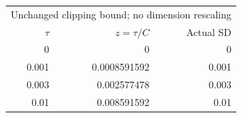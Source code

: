 \begin{tabular}{rrr}
\toprule
\multicolumn{3}{l}{Unchanged clipping bound; no dimension rescaling} \\
$\tau$ & $z=\tau/C$ & Actual SD \\
\midrule
0 & 0 & 0 \\
0.001 & 0.0008591592 & 0.001 \\
0.003 & 0.002577478 & 0.003 \\
0.01 & 0.008591592 & 0.01 \\
\bottomrule
\end{tabular}

